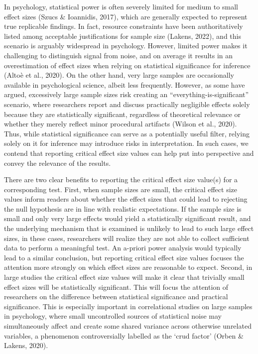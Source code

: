 \documentclass[
  man]{apa7}
\begin{document}
In psychology, statistical power is often severely limited for medium to small effect sizes (Szucs \& Ioannidis, 2017), which are generally expected to represent true replicable findings. In fact, resource constraints have been authoritatively listed among acceptable justifications for sample size (Lakens, 2022), and this scenario is arguably widespread in psychology. However, limited power makes it challenging to distinguish signal from noise, and on average it results in an overestimation of effect sizes when relying on statistical significance for inference (Altoè et al., 2020). On the other hand, very large samples are occasionally available in psychological science, albeit less frequently. However, as some have argued, excessively large sample sizes risk creating an ``everything-is-significant'' scenario, where researchers report and discuss practically negligible effects solely because they are statistically significant, regardless of theoretical relevance or whether they merely reflect minor procedural artifacts (Wilson et al., 2020). Thus, while statistical significance can serve as a potentially useful filter, relying solely on it for inference may introduce risks in interpretation. In such cases, we contend that reporting critical effect size values can help put into perspective and convey the relevance of the results.

There are two clear benefits to reporting the critical effect size value(s) for a corresponding test. First, when sample sizes are small, the critical effect size values inform readers about whether the effect sizes that could lead to rejecting the null hypothesis are in line with realistic expectations. If the sample size is small and only very large effects would yield a statistically significant result, and the underlying mechanism that is examined is unlikely to lead to such large effect sizes, in these cases, researchers will realize they are not able to collect sufficient data to perform a meaningful test. An a-priori power analysis would typically lead to a similar conclusion, but reporting critical effect size values focuses the attention more strongly on which effect sizes are reasonable to expect. Second, in large studies the critical effect size values will make it clear that trivially small effect sizes will be statistically significant. This will focus the attention of researchers on the difference between statistical significance and practical significance. This is especially important in correlational studies on large samples in psychology, where small uncontrolled sources of statistical noise may simultaneously affect and create some shared variance across otherwise unrelated variables, a phenomenon controversially labelled as the `crud factor' (Orben \& Lakens, 2020).
\end{document}
